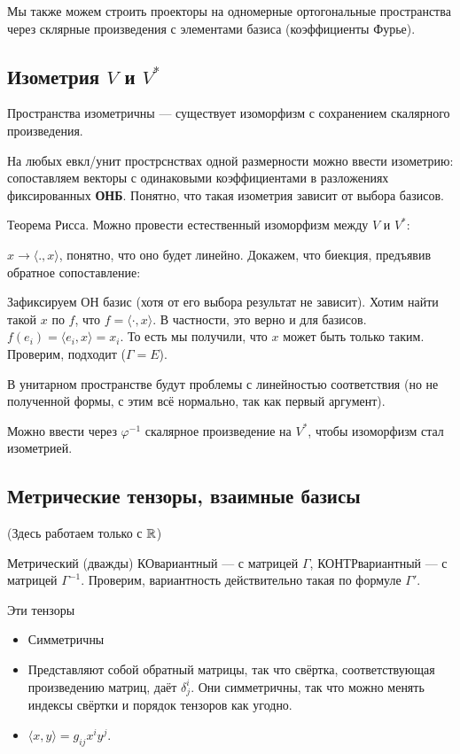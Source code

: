 \documentclass[12pt, a4paper]{article}
\begin{document}
Мы также можем строить проекторы на одномерные ортогональные пространства через склярные произведения с элементами базиса (коэффициенты Фурье).

\subsection{Изометрия $V$ и $V^{*}$}

Пространства изометричны — существует изоморфизм с сохранением скалярного произведения.

На любых евкл/унит прострснствах одной размерности можно ввести изометрию: 
сопоставляем векторы с одинаковыми коэффициентами в разложениях фиксированных \textbf{ОНБ}. 
Понятно, что такая изометрия зависит от выбора базисов.

Теорема Рисса. Можно провести естественный изоморфизм между $V$ и $V^*$:

$x → \langle ., x \rangle$, понятно, что оно будет линейно. Докажем, что биекция, предъявив обратное сопоставление:

Зафиксируем ОН базис (хотя от его выбора результат не зависит). Хотим найти такой $x$ по $f$, что $f = \langle \cdot, x \rangle$.
В частности, это верно и для базисов. $f(e_i) = \langle e_i, x \rangle = x_i$.
То есть мы получили, что $x$ может быть только таким. Проверим, подходит ($\Gamma = E$).

В унитарном пространстве будут проблемы с линейностью соответствия (но не полученной формы, с этим всё нормально, так как первый аргумент).

Можно ввести через $\varphi^{-1}$ скалярное произведение на $V^*$, чтобы изоморфизм стал изометрией.


\subsection{Метрические тензоры, взаимные базисы}

(Здесь работаем только с ${\mathbb{R}}$)

Метрический (дважды) КОвариантный — с матрицей $\Gamma$, КОНТРвариантный — с матрицей $\Gamma^{-1}$.
Проверим, вариантность действительно такая по формуле $\Gamma'$.

Эти тензоры 

\begin{itemize}
    \item Симметричны
    \item Представляют собой обратный матрицы, так что свёртка, соответствующая произведению матриц, даёт $\delta^i_j$. Они симметричны, так что можно менять индексы свёртки и порядок тензоров как угодно.
    \item $\langle x, y \rangle = g_{ij} x^i y^j$.
\end{itemize}
\end{document}
